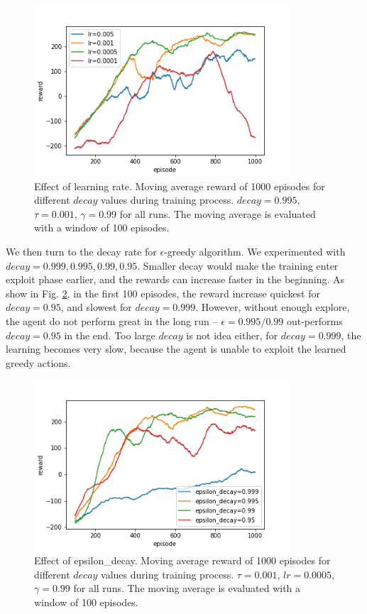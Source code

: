 \documentclass[conference]{IEEEtran}
\begin{document}
	\begin{figure}
		\includegraphics[height=2.5in]{figures/lr.png} 
		\caption{Effect of learning rate. Moving average reward of 1000 episodes for different $decay$ values during training process. $decay=0.995$, $\tau=0.001$, $\gamma=0.99$ for all runs. The moving average is evaluated with a window of 100 episodes.}
		\label{fig:lr}
	\end{figure}

We then turn to the decay rate for $\epsilon$-greedy algorithm. We experimented with $decay = 0.999, 0.995, 0.99, 0.95$. Smaller decay would make the training enter exploit phase earlier, and the rewards can increase faster in the beginning. As show in Fig. \ref{fig:epsilon_decay}, in the first 100 episodes, the reward increase quickest for $decay = 0.95$, and slowest for $decay = 0.999$. However, without enough explore, the agent do not perform great in the long run -- $\epsilon = 0.995/0.99$ out-performs $decay = 0.95$ in the end. Too large $decay$ is not idea either, for $decay = 0.999$, the learning becomes very slow, because the agent is unable to exploit the learned greedy actions.

	\begin{figure}
		\includegraphics[height=2.5in]{figures/epsilon_decay.png} 
		\caption{Effect of epsilon\_decay. Moving average reward of 1000 episodes for different $decay$ values during training process. $\tau=0.001$, $lr=0.0005$, $\gamma=0.99$ for all runs. The moving average is evaluated with a window of 100 episodes.}
		\label{fig:epsilon_decay}
	\end{figure}
	
\end{document}
